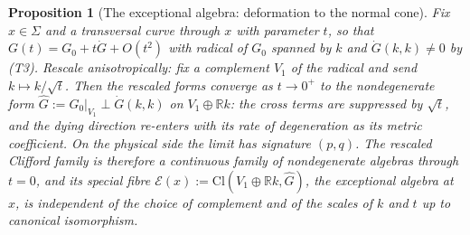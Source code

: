 \documentclass[11pt]{article}
\newtheorem{proposition}[theorem]{Proposition}
\theoremstyle{definition}
\newcommand{\Cl}{\mathrm{Cl}}
\newcommand{\R}{\mathbb{R}}
\newcommand{\shE}{\mathcal{E}}
\newcommand{\Sig}{\Sigma}
\begin{document}
\begin{proposition}[The exceptional algebra: deformation to the normal cone]\label{prop:exceptional}
Fix $x \in \Sig$ and a transversal curve through $x$ with parameter $t$, so that $G(t) = G_0 + t\dot G + O(t^2)$ with radical of $G_0$ spanned by $k$ and $\dot G(k,k) \neq 0$ by (T3). Rescale anisotropically: fix a complement $V_1$ of the radical and send $k \mapsto k/\sqrt{t}$. Then the rescaled forms converge as $t \to 0^+$ to the nondegenerate form $\hat G := G_0|_{V_1} \perp \dot G(k,k)$ on $V_1 \oplus \R k$: the cross terms are suppressed by $\sqrt{t}$, and the dying direction re-enters with its rate of degeneration as its metric coefficient. On the physical side the limit has signature $(p, q)$. The rescaled Clifford family is therefore a continuous family of nondegenerate algebras through $t = 0$, and its special fibre $\shE(x) := \Cl(V_1 \oplus \R k, \hat G)$, the \emph{exceptional algebra} at $x$, is independent of the choice of complement and of the scales of $k$ and $t$ up to canonical isomorphism.
\end{proposition}
\end{document}
